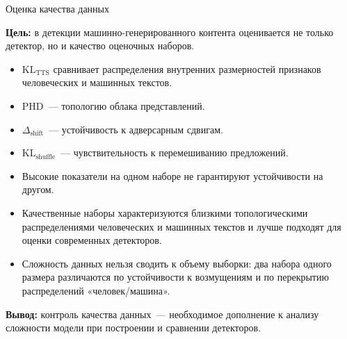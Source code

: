 \documentclass[10pt,pdf,hyperref={unicode}]{beamer}
\begin{document}
\begin{frame}{Оценка качества данных}
\justifying
\small

\textbf{Цель:} в детекции машинно-генерированного контента оценивается не только детектор, но и качество оценочных наборов.

\begin{itemize}
    \item $\mathrm{KL}_{\mathrm{TTS}}$ сравнивает распределения внутренних размерностей признаков человеческих и машинных текстов.
    \item PHD~--- топологию облака представлений.
    \item $\Delta_{\mathrm{shift}}$~--- устойчивость к адверсарным сдвигам.
    \item $\mathrm{KL}_{\mathrm{shuffle}}$~--- чувствительность к перемешиванию предложений.
    \item Высокие показатели на одном наборе не гарантируют устойчивости на другом.
    \item Качественные наборы характеризуются близкими топологическими распределениями человеческих и машинных текстов и лучше подходят для оценки современных детекторов.
    \item Сложность данных нельзя сводить к объему выборки: два набора одного размера различаются по устойчивости к возмущениям и по перекрытию распределений «человек/машина».
\end{itemize}

\textbf{Вывод:} контроль качества данных~--- необходимое дополнение к анализу сложности модели при построении и сравнении детекторов.
\end{frame}
\end{document}
